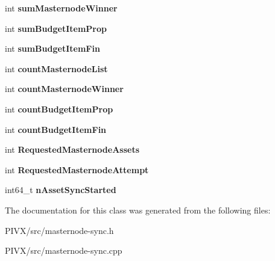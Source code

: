 \begin{DoxyCompactItemize}
int {\bfseries sum\+Masternode\+Winner}
\item 
\mbox{\label{class_c_masternode_sync_a4af49fa0ff3d83af9586b8dc0ef2cff2}} 
int {\bfseries sum\+Budget\+Item\+Prop}
\item 
\mbox{\label{class_c_masternode_sync_a5d2346ccd760d5c60aa3d524f2c728a7}} 
int {\bfseries sum\+Budget\+Item\+Fin}
\item 
\mbox{\label{class_c_masternode_sync_a553511c9e94d9fd54b333f0d08b5d983}} 
int {\bfseries count\+Masternode\+List}
\item 
\mbox{\label{class_c_masternode_sync_a9f4de5c60336ed2b8c09181a75248fc8}} 
int {\bfseries count\+Masternode\+Winner}
\item 
\mbox{\label{class_c_masternode_sync_a7eaf5b92aa75c86d5b7f2b8a2c5f97ae}} 
int {\bfseries count\+Budget\+Item\+Prop}
\item 
\mbox{\label{class_c_masternode_sync_adeb982a5cb4d05fbbe89bf91e93414fc}} 
int {\bfseries count\+Budget\+Item\+Fin}
\item 
\mbox{\label{class_c_masternode_sync_a9615511c1a4e1646dc81c91d06acb1e3}} 
int {\bfseries Requested\+Masternode\+Assets}
\item 
\mbox{\label{class_c_masternode_sync_a9595313d7322739818728593443e0484}} 
int {\bfseries Requested\+Masternode\+Attempt}
\item 
\mbox{\label{class_c_masternode_sync_aa759b160e8fd190a1419b4e5c35bcd05}} 
int64\+\_\+t {\bfseries n\+Asset\+Sync\+Started}
\end{DoxyCompactItemize}


The documentation for this class was generated from the following files\+:\begin{DoxyCompactItemize}
\item 
P\+I\+V\+X/src/masternode-\/sync.\+h\item 
P\+I\+V\+X/src/masternode-\/sync.\+cpp\end{DoxyCompactItemize}
